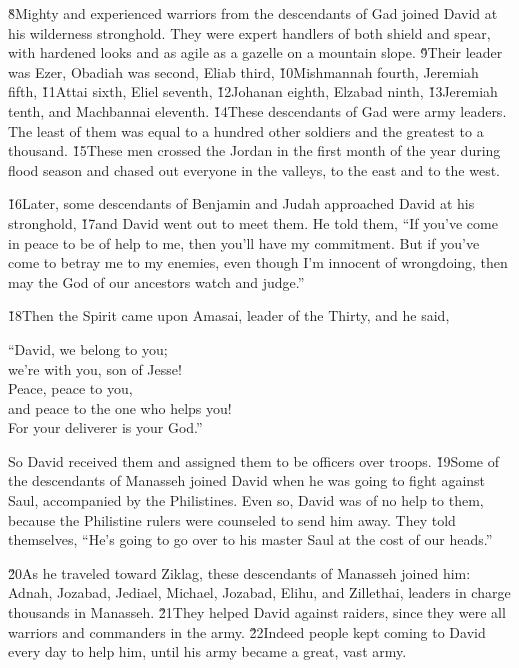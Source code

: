 \v{8}Mighty and experienced warriors from the descendants of Gad joined David at his wilderness stronghold. They were expert handlers of both shield and spear, with hardened looks and as agile as a gazelle on a mountain slope. \v{9}Their leader was Ezer, Obadiah was second, Eliab third, \v{10}Mishmannah fourth, Jeremiah fifth, \v{11}Attai sixth, Eliel seventh, \v{12}Johanan eighth, Elzabad ninth, \v{13}Jeremiah tenth, and Machbannai eleventh. \v{14}These descendants of Gad were army leaders. The least of them was equal to a hundred other soldiers and the greatest to a thousand. \v{15}These men crossed the Jordan in the first month of the year during flood season and chased out everyone in the valleys, to the east and to the west.

\v{16}Later, some descendants of Benjamin and Judah approached David at his stronghold, \v{17}and David went out to meet them. He told them, ``If you've come in peace to be of help to me, then you'll have my commitment. But if you've come to betray me to my enemies, even though I'm innocent of wrongdoing, then may the God of our ancestors watch and judge.''

\v{18}Then the Spirit came upon Amasai, leader of the Thirty, and he said,

\begin{poetry}
\poeml ``David, we belong to you; \\
\poemll    we're with you, son of Jesse! \\
\poeml Peace, peace to you, \\
\poemll    and peace to the one who helps you! \\
\poemlll       For your deliverer is your God.''
\end{poetry}

So David received them and assigned them to be officers over troops. \v{19}Some of the descendants of Manasseh joined David when he was going to fight against Saul, accompanied by the Philistines. Even so, David was of no help to them, because the Philistine rulers were counseled to send him away. They told themselves, ``He's going to go over to his master Saul at the cost of our heads.''

\v{20}As he traveled toward Ziklag, these descendants of Manasseh joined him: Adnah, Jozabad, Jediael, Michael, Jozabad, Elihu, and Zillethai, leaders in charge thousands in Manasseh. \v{21}They helped David against raiders, since they were all warriors and commanders in the army. \v{22}Indeed people kept coming to David every day to help him, until his army became a great, vast army.


